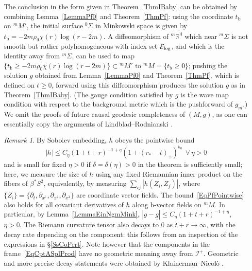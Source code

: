 \documentclass[reqno,11pt,letterpaper]{amsart}
\numberwithin{equation}{section}
\numberwithin{figure}{section}
\theoremstyle{definition}
\theoremstyle{remark}
\newtheorem{rmk}[thm]{Remark}
\newcommand{\mc}{\mathcal}
\newcommand{\cE}{\mc E}
\newcommand{\ms}{\mathscr}
\newcommand{\scri}{\ms I}
\newcommand{\R}{\mathbb{R}}
\newcommand{\ol}{\overline}
\newcommand{\pa}{\partial}
\newcommand{\ul}[1]{\underline{#1}{}}
\newcommand{\bop}{{\mathrm{b}}}
\begin{document}
The conclusion in the form given in Theorem~\ref{ThmIBaby} can be obtained by combining Lemma~\ref{LemmaPf0} and Theorem~\ref{ThmPf}: using the coordinate $t_\bop$ on ${}^m\!M'$, the initial surface ${}^0\Sigma$ in Minkowski space is given by $t_\bop=-2 m \rho_0\chi(r)\log(r-2 m)$. A diffeomorphism of ${}^m\ol{\R^4}$ which near ${}^m\Sigma$ is not smooth but rather polyhomogeneous with index set $\cE_{\rm log}$, and which is the identity away from ${}^m\Sigma$, can be used to map $\{t_\bop\geq -2 m\rho_0\chi(r)\log(r-2 m)\}\subset{}^m\!M'$ to ${}^m\!M=\{t_\bop\geq 0\}$; pushing the solution $g$ obtained from Lemma~\ref{LemmaPf0} and Theorem~\ref{ThmPf}, which is defined on $t\geq 0$, forward using this diffeomorphism produces the solution $g$ as in Theorem~\ref{ThmIBaby}. (The gauge condition satisfied by $g$ is the wave map condition with respect to the background metric which is the pushforward of $g_m$.) We omit the proofs of future causal geodesic completeness of $(M,g)$, as one can essentially copy the arguments of Lindblad--Rodnianski \cite[\S16]{LindbladRodnianskiGlobalExistence}.

\begin{rmk}
\label{RmkPfPointwise}
  By Sobolev embedding, $h$ obeys the pointwise bound
  \begin{equation}
  \label{EqPfPointwise}
    |h|\leq C_\eta(1+t+r)^{-1+\eta}(1+(r_*-t)_+)^{b_0}\ \ \forall\,\eta>0
  \end{equation}
  and is small for fixed $\eta>0$ if $\delta=\delta(\eta)>0$ in the theorem is sufficiently small; here, we measure the size of $h$ using any fixed Riemannian inner product on the fibers of $\beta^*S^2$, equivalently, by measuring $\sum_{i j}|h(Z_i,Z_j)|$, where $\{Z_i\}=\{\pa_t,\pa_{x^1},\pa_{x^2},\pa_{x^3}\}$ are coordinate vector fields. The bound~\eqref{EqPfPointwise} also holds for all covariant derivatives of $h$ along b-vector fields on ${}^m\!M$. In particular, by Lemma~\ref{LemmaEinNgmMink}, $|g-\ul g|\leq C_\eta(1+t+r)^{-1+\eta}$, $\eta>0$. The Riemann curvature tensor also decays to $0$ as $t+r\to\infty$, with the decay rate depending on the component: this follows from an inspection of the expressions in \S\ref{SsCoPert}. Note however that the components in the frame~\eqref{EqCptASplProd} have no geometric meaning away from $\scri^+$. Geometric and more precise decay statements were obtained by Klainerman--Nicol\`o \cite{KlainermanNicoloEvolution}.
\end{rmk}
\end{document}
